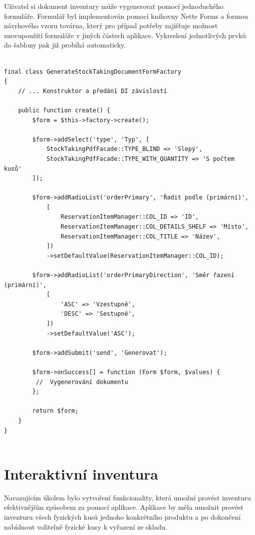 Uživatel si dokument inventury může vygenerovat pomocí jednoduchého formuláře. Formulář byl implementován pomocí knihovny Nette Forms a formou návrhového vzoru továrna, který pro případ potřeby zajišťuje možnost znovupoužití formuláře v jiných částech aplikace. \cite{refactoringFactoryMethod}
Vykreslení jednotlivých prvků do šablony pak již probíhá automaticky.

\begin{lstlisting}[label=src:GenerateStockTakingDocumentFormFactory,caption={Továrna formuláře pro generování dokumentu s inventurou}]

final class GenerateStockTakingDocumentFormFactory
{
    // ... Konstruktor a předání DI závislostí

    public function create() {
		$form = $this->factory->create();

		$form->addSelect('type', 'Typ', [
            StockTakingPdfFacade::TYPE_BLIND => 'Slepý',
            StockTakingPdfFacade::TYPE_WITH_QUANTITY => 'S počtem kusů'
        ]);

        $form->addRadioList('orderPrimary', 'Řadit podle (primární)',
            [
                ReservationItemManager::COL_ID => 'ID',
                ReservationItemManager::COL_DETAILS_SHELF => 'Místo',
                ReservationItemManager::COL_TITLE => 'Název',
            ])
            ->setDefaultValue(ReservationItemManager::COL_ID);

        $form->addRadioList('orderPrimaryDirection', 'Směr řazení (primární)',
            [
                'ASC' => 'Vzestupně',
                'DESC' => 'Sestupně',
            ])
            ->setDefaultValue('ASC');

		$form->addSubmit('send', 'Generovat');

		$form->onSuccess[] = function (Form $form, $values) {
         //  Vygenerování dokumentu
		};

		return $form;
	}
}


\end{lstlisting}

\section{Interaktivní inventura}

Navazujícím úkolem bylo vytvoření funkcionality, která umožní provést inventuru efektivnějším způsobem za pomocí aplikace. Aplikace by měla umožnit provést inventuru všech fyzických kusů jednoho konkrétního produktu a po dokončení nabídnout volitelně fyzické kusy k vyřazení ze skladu. 

